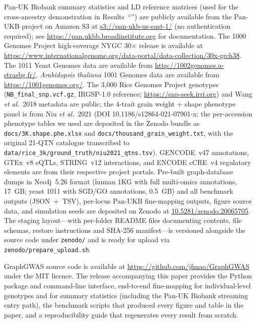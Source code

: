 \documentclass[pdflatex,sn-nature]{sn-jnl}
\begin{document}
Pan-UK Biobank summary statistics and LD reference matrices (used for
the cross-ancestry demonstration in Results~``'') are
publicly available from the Pan-UKB project on Amazon S3 at
\url{s3://pan-ukb-us-east-1/} (no authentication required); see
\url{https://pan.ukbb.broadinstitute.org} for documentation. The 1000
Genomes Project high-coverage NYGC 30$\times$ release is available at
\url{https://www.internationalgenome.org/data-portal/data-collection/30x-grch38}.
The 1011 Yeast Genomes data are available from
\url{http://1002genomes.u-strasbg.fr/}. \emph{Arabidopsis thaliana}
1001 Genomes data are available from
\url{https://1001genomes.org/}. The 3{,}000 Rice Genomes Project
genotypes (\texttt{NB\_final\_snp.vcf.gz}, IRGSP-1.0 reference;
\url{https://snp-seek.irri.org}) and Wang \emph{et al.}\ 2018
metadata are public; the 4-trait grain weight + shape phenotype
panel is from Niu \emph{et al.}\ 2021 \cite{niu2021grain} (DOI
10.1186/s12864-021-07901-x; the per-accession phenotype tables we
used are deposited in the Zenodo bundle as
\texttt{docs/3K.shape.phe.xlsx} and
\texttt{docs/thousand\_grain\_weight.txt}, with the original 21-QTN
catalogue transcribed to
\texttt{data/rice\_3k/ground\_truth/niu2021\_qtns.tsv}). GENCODE~v47 annotations, GTEx~v8
eQTLs, STRING~v12 interactions, and ENCODE cCRE~v4 regulatory
elements are from their respective project portals. Pre-built
graph-database dumps in Neo4j~5.26 format (human 1KG with full
multi-omics annotations, 17~GB; yeast 1011 with SGD/GO
annotations, 0.5~GB) and all benchmark outputs (JSON~+~TSV),
per-locus Pan-UKB fine-mapping outputs, figure source data, and
simulation seeds are deposited on Zenodo at
\href{https://doi.org/10.5281/zenodo.20065705}{10.5281/zenodo.20065705}.
The staging layout---with per-folder README files
documenting contents, file schemas, restore instructions and
SHA-256 manifest---is versioned alongside the source code under
\texttt{zenodo/} and is ready for upload via
\texttt{zenodo/prepare\_upload.sh}.


GraphGWAS source code is available at
\url{https://github.com/jfmao/GraphGWAS} under the MIT licence. The
release accompanying this paper provides the Python package and
command-line interface, end-to-end fine-mapping for individual-level
genotypes and for summary statistics (including the Pan-UK Biobank
streaming entry path), the benchmark scripts that produced every
figure and table in the paper, and a reproducibility guide that
regenerates every result from scratch.
\end{document}
